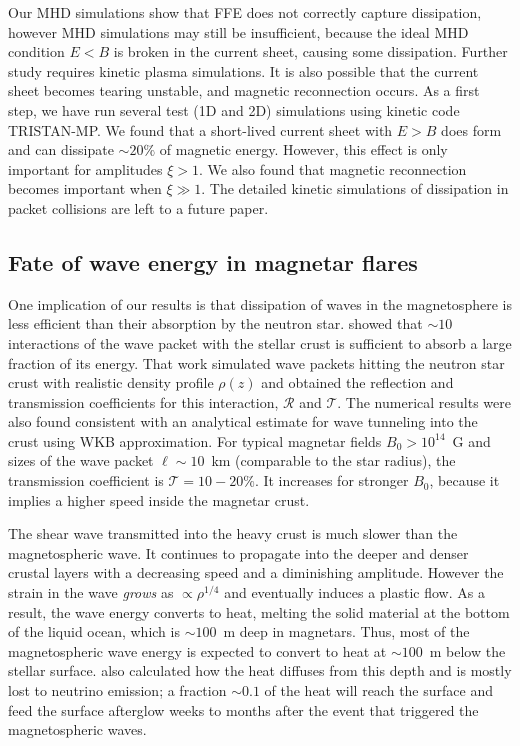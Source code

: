 Our MHD simulations show that FFE does not correctly capture dissipation, however MHD simulations may still be insufficient, because the ideal MHD condition $E<B$ is broken in the current sheet, causing some dissipation. Further study requires kinetic plasma simulations. It is also possible that the current sheet becomes tearing unstable, and magnetic reconnection occurs.
As a first step, we have run several test (1D and 2D) simulations using kinetic code TRISTAN-MP. 
We found that a short-lived current sheet with $E>B$ does form and can dissipate $\sim 20\%$ of magnetic energy. However, this effect is only important for amplitudes $\xi>1$. We also found that magnetic reconnection becomes important when $\xi\gg 1$. The detailed kinetic simulations of dissipation in packet collisions are left to a future paper.

\subsection{Fate of wave energy in magnetar flares}

One implication of our results is that dissipation of \alfven waves in the magnetosphere is less efficient than their absorption by the neutron star. \citet{2015ApJ...815...25L} showed that $\sim 10$ interactions of the wave packet with the stellar crust is sufficient to absorb a large fraction of its energy. That work simulated \alfven wave packets hitting the neutron star crust with realistic density profile $\rho(z)$ and obtained the reflection and transmission coefficients for this interaction, $\mathcal{R}$ and $\mathcal{T}$. The numerical results were also found consistent with an analytical estimate for wave tunneling into the crust using WKB approximation. For typical magnetar fields $B_0>10^{14}$~G  and sizes of the wave packet $\ell\sim 10$~km (comparable to the star radius), the transmission coefficient is $\mathcal{T}=10-20\%$. It increases for stronger $B_0$, because it implies a higher \alfven speed inside the magnetar crust.

The shear wave transmitted into the heavy crust is much slower than the magnetospheric \alfven wave. It continues to propagate into the deeper and denser crustal layers with a decreasing speed and a diminishing amplitude. 
However the strain in the wave {\it grows} as $\propto \rho^{1/4}$ and eventually induces a plastic flow. As a result, the wave energy converts to heat, melting the solid material at the bottom of the liquid ocean, which is $\sim 100$~m deep in magnetars. Thus, most of the magnetospheric wave energy is expected to convert to heat at $\sim 100$~m below the stellar surface. \citet{2015ApJ...815...25L} also calculated how the heat diffuses from this depth and is mostly lost to neutrino emission; a fraction $\sim 0.1$ of the heat will reach the surface and feed the surface afterglow weeks to months after the event that triggered the magnetospheric waves.

